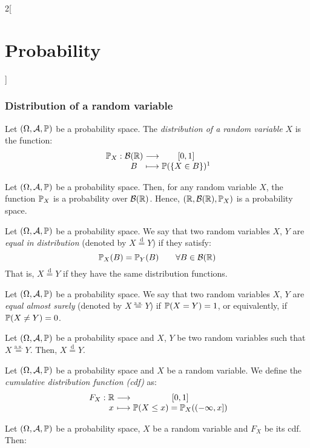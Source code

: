 \documentclass[../../../main.tex]{subfiles}
\begin{document}
\begin{multicols}{2}[\section{Probability}]
  \subsubsection{Distribution of a random variable}
  \begin{definition}
    Let $(\Omega,\mathcal{A},\mathbb{P})$ be a probability space. The \textit{distribution of a random variable} $X$ is the function:
    $$
      \function{\Prob_X}{\mathcal{B}(\RR)}{[0,1]}{B}{\Prob(\{X\in B\})\footnotemark}
    $$
  \end{definition}
  \begin{prop}
    Let $(\Omega,\mathcal{A},\mathbb{P})$ be a probability space. Then, for any random variable $X$, the function $\mathbb{P}_X$ is a probability over $\mathcal{B}(\mathbb{R})$. Hence, $(\mathbb{R},\mathcal{B}(\mathbb{R}),\mathbb{P}_X)$ is a probability space.
  \end{prop}
  \begin{definition}
    Let $(\Omega,\mathcal{A},\mathbb{P})$ be a probability space. We say that two random variables $X$, $Y$ are \textit{equal in distribution} (denoted by $X\overset{\text{d}}{=}Y$) if they satisfy: $$\mathbb{P}_X(B)=\mathbb{P}_Y(B)\qquad\forall B\in\mathcal{B}(\mathbb{R})$$ That is, $X\overset{\text{d}}{=}Y$ if they have the same distribution functions.
  \end{definition}
  \begin{definition}
    Let $(\Omega,\mathcal{A},\mathbb{P})$ be a probability space. We say that two random variables $X$, $Y$ are \textit{equal almost surely} (denoted by $X\overset{\text{a.s.}}{=}Y$) if $\mathbb{P}(X=Y)=1$, or equivalently, if $\mathbb{P}(X\ne Y)=0$.
  \end{definition}
  \begin{prop}
    Let $(\Omega,\mathcal{A},\mathbb{P})$ be a probability space and $X$, $Y$ be two random variables such that $X\overset{\text{a.s.}}{=}Y$. Then, $X\overset{\text{d}}{=}Y$.
  \end{prop}
  \begin{definition}
    Let $(\Omega,\mathcal{A},\mathbb{P})$ be a probability space and $X$ be a random variable. We define the \textit{cumulative distribution function (cdf)} as:
    $$
      \function{F_X}{\RR}{[0,1]}{x}{\Prob(X\leq x)=\Prob_X((-\infty,x])}
    $$
  \end{definition}
  \begin{theorem}
    Let $(\Omega,\mathcal{A},\mathbb{P})$ be a probability space, $X$ be a random variable and $F_X$ be its cdf. Then:

\end{theorem}
\end{multicols}
\end{document}
